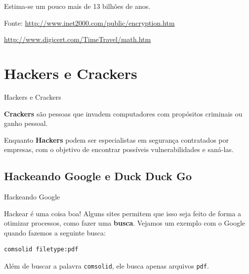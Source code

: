 \begin{frame}


\end{frame}

\begin{frame}


Estima-se um pouco mais de 13 bilhões de anos.

Fonte: \url{http://www.inet2000.com/public/encryption.htm}

\url{http://www.digicert.com/TimeTravel/math.htm}

\end{frame}

\begin{frame}


\end{frame}

\section{Hackers e Crackers}\label{hackers-e-crackers}

\begin{frame}{Hackers e Crackers}

\textbf{Crackers} são pessoas que invadem computadores com propósitos
criminais ou ganho pessoal.

\bigskip

Enquanto \textbf{Hackers} podem ser especialistas em segurança
contratados por empresas, com o objetivo de encontrar possíveis
vulnerabilidades e saná-las.

\end{frame}

\subsection{Hackeando Google e Duck Duck
Go}\label{hackeando-google-e-duck-duck-go}

\begin{frame}[fragile]{Hackeando Google}

Hackear é uma coisa boa! Alguns sites permitem que isso seja feito de
forma a otimizar processos, como fazer uma \textbf{busca}. Vejamos um
exemplo com o Google quando fazemos a seguinte busca:

\begin{verbatim}
comsolid filetype:pdf
\end{verbatim}

Além de buscar a palavra \texttt{comsolid}, ele busca apenas arquivos
\texttt{pdf}.

\end{frame}

